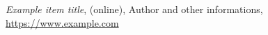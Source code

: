 \begin{thebibliography}{2}
    \textit{Example item title},
    (online), Author and other informations, \\
    \url{https://www.example.com}

\end{thebibliography}
